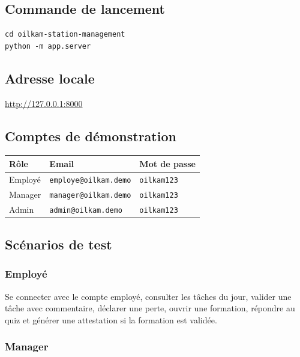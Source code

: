 \documentclass[11pt,a4paper]{article}
\newcommand{\code}[1]{\texttt{#1}}
\begin{document}
\subsection{Commande de lancement}

\begin{verbatim}
cd oilkam-station-management
python -m app.server
\end{verbatim}

\subsection{Adresse locale}

\begin{center}
\url{http://127.0.0.1:8000}
\end{center}

\subsection{Comptes de démonstration}

\begin{center}
\begin{tabular}{|p{3cm}|p{5cm}|p{3cm}|}
\hline
\textbf{Rôle} & \textbf{Email} & \textbf{Mot de passe} \\
\hline
Employé & \code{employe@oilkam.demo} & \code{oilkam123} \\
\hline
Manager & \code{manager@oilkam.demo} & \code{oilkam123} \\
\hline
Admin & \code{admin@oilkam.demo} & \code{oilkam123} \\
\hline
\end{tabular}
\end{center}

\subsection{Scénarios de test}

\subsubsection*{Employé}

Se connecter avec le compte employé, consulter les tâches du jour, valider une tâche avec commentaire, déclarer une perte, ouvrir une formation, répondre au quiz et générer une attestation si la formation est validée.

\subsubsection*{Manager}
\end{document}
